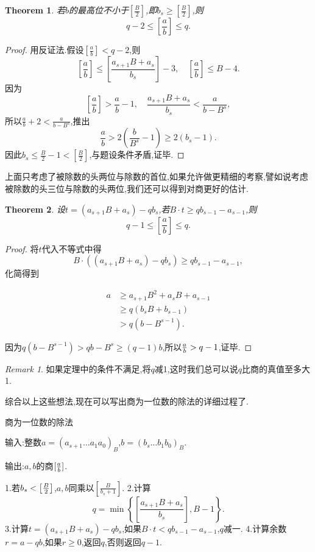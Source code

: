 \documentclass{ctexart}
\newtheorem{theorem}{Theorem}
\theoremstyle{remark}
\newtheorem{remark}{Remark}
\theoremstyle{definition}
\newtheorem{proof}{Proof}
\begin{document}
\begin{theorem}\label{th:division2}
若$b$的最高位不小于$\left[\frac{B}{2}\right]$,即$b_s\ge\left[\frac{B}{2}\right]$,则$$q-2\le\left[\frac{a}{b}\right]\le q.$$
\end{theorem}
\begin{proof}
用反证法.假设$\left[\frac{a}{b}\right]<q-2$,则$$\left[\frac{a}{b}\right]\le\left[\frac{a_{s+1}B+a_s}{b_s}\right]-3,\quad\left[\frac{a}{b}\right] \le B-4.$$
因为$$\left[\frac{a}{b}\right]>\frac{a}{b}-1,\quad\frac{a_{s+1}B+a_s}{b_s}<\frac{a}{b-B^s},$$所以$\frac{a}{b}+2<\frac{a}{b-B^s}$,推出$$\frac{a}{b}>2(\frac{b}{B^s}-1)\ge 2(b_s-1).$$因此$b_s \le \frac{B}{2}-1<\left[\frac{B}{2}\right]$,与题设条件矛盾,证毕.
\end{proof}

上面只考虑了被除数的头两位与除数的首位,如果允许做更精细的考察,譬如说考虑被除数的头三位与除数的头两位,我们还可以得到对商更好的估计.
\begin{theorem}\label{th:division3}
设$t=(a_{s+1}B+a_s)-qb_s$,若$B\cdot t\ge qb_{s-1}-a_{s-1}$,则$$q-1\le\left[\frac{a}{b}\right]\le q.$$
\end{theorem}
\begin{proof}
将$t$代入不等式中得$$B\cdot((a_{s+1}B+a_s)-qb_s)\ge qb_{s-1}-a_{s-1},$$化简得到

\begin{align*}
a&\ge a_{s+1}B^2+a_sB+a_{s-1}\\
&\ge q(b_sB+b_{s-1})\\
&>q(b-B^{s-1}).
\end{align*}

因为$q(b-B^{s-1})>qb-B^s\ge(q-1)b$,所以${a\over b}>q-1$,证毕.
\end{proof}
\begin{remark}
如果定理中的条件不满足,将$q$减1,这时我们总可以说$q$比商的真值至多大1.
\end{remark}

综合以上这些想法,现在可以写出商为一位数的除法的详细过程了.
\begin{algorithm}{商为一位数的除法}\label{al:div1}

输入:整数$a=(a_{s+1}\ldots a_1a_0)_B$,$b=(b_s\ldots b_1b_0)_B$.

输出:$a,b$的商$[{a\over b}]$.

 1.若$b_s<\left[{B\over 2}\right]$,$a,b$同乘以$\left[\frac{B}{b_s+1}\right]$.
 2.计算$$q = \min\left\{\left[\frac{a_{s+1}B+a_s}{b_s}\right],B-1\right\}.$$
 3.计算$t=(a_{s+1}B+a_s)-qb_s$,如果$B\cdot t<qb_{s-1}-a_{s-1}$,$q$减一.
 4.计算余数$r=a-qb$,如果$r\ge 0$,返回$q$,否则返回$q-1$.
\end{algorithm}
\end{document}
